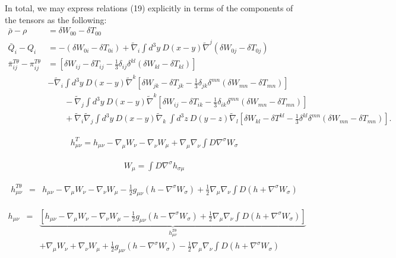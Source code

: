 \documentclass[10pt,letterpaper]{article}
\numberwithin{equation}{section}
\begin{document}
In total, we may express relations (19) explicitly in terms of the components of the tensors as the following:
\begin{align}
 \bar \rho - \rho &= \delta W_{00} - \delta T_{00}\\
 \bar Q_i - Q_i & = -(\delta W_{0i}-\delta T_{0i}) + \tilde\nabla_i \int d^3y\ D(x-y)\tilde\nabla^j( \delta W_{0j}-\delta T_{0j})
\\
\bar \pi^{T\theta}_{ij} - \pi_{ij}^{T\theta}&= \left[\delta W_{ij} -\delta T_{ij} -\frac13 \delta_{ij} \delta^{kl}\left(\delta W_{kl}-\delta T_{kl}\right)\right] 
\nonumber\\
&- \tilde\nabla_i \int d^3y\ D(x-y) \tilde\nabla^k \left[\delta W_{jk}-\delta T_{jk} 
-\frac13 \delta_{jk} \delta^{mn}\left(\delta W_{mn}-\delta T_{mn}\right)\right]
\nonumber\\
&\qquad
 - \tilde\nabla_j \int d^3y\ D(x-y) \tilde\nabla^k \left[\delta W_{ij} -\delta T_{ik} -\frac13 \delta_{ik} \delta^{mn}\left(\delta W_{mn} -\delta T_{mn}\right)\right]
\nonumber\\
&\qquad
+\tilde\nabla_i\tilde\nabla_j \int d^3y\ D(x-y) \tilde\nabla_k\ \int d^3z\ D(y-z) \tilde\nabla_l \left[\delta W_{kl}-\delta T^{kl} -\frac13 \delta^{kl} \delta^{mn}\left(\delta W_{mn}-\delta T_{mn}\right)\right].
\end{align}

\begin{eqnarray}
h_{\mu\nu}^T = h_{\mu\nu} - \nabla_\mu W_\nu - \nabla_\nu W_\mu + \nabla_\mu \nabla_\nu \int D \nabla^\sigma W_\sigma 
\end{eqnarray}

\begin{eqnarray}
W_\mu = \int D \nabla^\sigma h_{\sigma\mu}
\end{eqnarray}

\begin{eqnarray}
h_{\mu\nu}^{T\theta}&=&h_{\mu\nu} - \nabla_\mu W_\nu - \nabla_\nu W_\mu -\frac12 g_{\mu\nu}(h-\nabla^\sigma W_\sigma) + \frac12 \nabla_\mu \nabla_\nu \int D(h+\nabla^\sigma W_\sigma)
\end{eqnarray}

\begin{eqnarray}
h_{\mu\nu}&=&\underbrace{\left[ h_{\mu\nu} - \nabla_\mu W_\nu - \nabla_\nu W_\mu - \frac12 g_{\mu\nu}(h-\nabla^\sigma W_\sigma) + \frac12 \nabla_\mu \nabla_\nu \int D(h+\nabla^\sigma W_\sigma) \right]}_{h^{T\theta}_{\mu\nu}}
\nonumber\\
&& + \nabla_\mu W_\nu + \nabla_\nu W_\mu + \frac12 g_{\mu\nu}(h-\nabla^\sigma W_\sigma) - \frac12 \nabla_\mu \nabla_\nu \int D(h+\nabla^\sigma W_\sigma)
\end{eqnarray}
\end{document}
